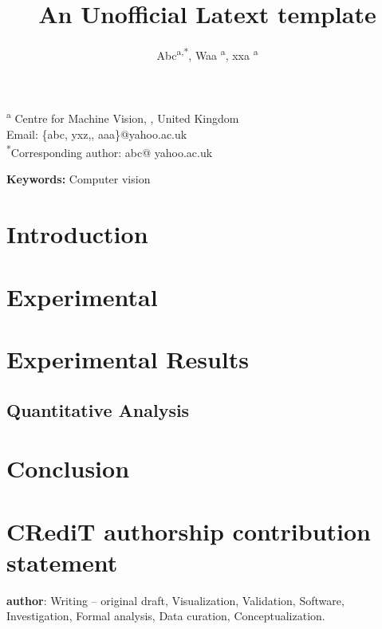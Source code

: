 \documentclass[12pt]{article}
\begin{document}
\title{An Unofficial Latext template}
\author{
    Abc\textsuperscript{a,*},
    Waa \textsuperscript{a},
    xxa \textsuperscript{a}
}
\date{}

\maketitle

\noindent\textsuperscript{a} Centre for Machine Vision, , United Kingdom \\
Email: \{abc, yxz,, aaa\}@yahoo.ac.uk \\
\textsuperscript{*}Corresponding author: abc@ yahoo.ac.uk

\begin{abstract}


\end{abstract}

\textbf{Keywords:} Computer vision

\doublespacing

\section{Introduction}

\citep{barbole_comparative_2023}


\section{Experimental}

\section{Experimental Results}

\subsection{Quantitative Analysis}

\section{Conclusion}


\section*{CRediT authorship contribution statement}
\textbf{author}: Writing – original draft, Visualization, Validation, Software, Investigation, Formal analysis, Data curation, Conceptualization. 
\end{document}
